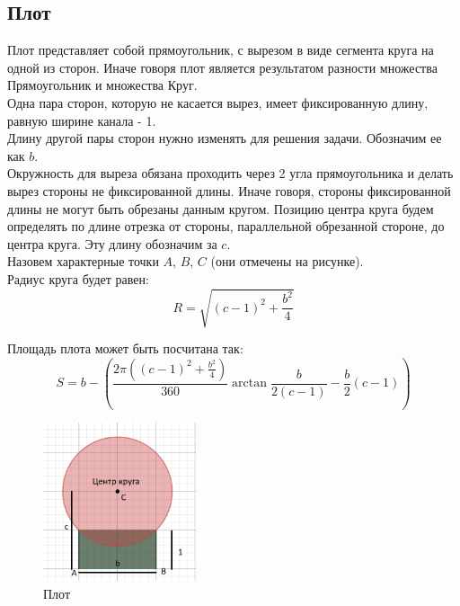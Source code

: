 \subsection{Плот}
Плот представляет собой прямоугольник, с вырезом в виде сегмента круга на одной из сторон. Иначе говоря плот является результатом разности множества Прямоугольник и множества Круг. \\

Одна пара сторон, которую не касается вырез, имеет фиксированную длину, равную ширине канала - 1. \\

Длину другой пары сторон нужно изменять для решения задачи. Обозначим ее как $b$. \\ 

Окружность для выреза обязана проходить через 2 угла прямоугольника и делать вырез стороны не фиксированной длины. Иначе говоря, стороны фиксированной длины не могут быть обрезаны данным кругом. Позицию центра круга будем определять по длине отрезка от стороны, параллельной обрезанной стороне, до центра круга. Эту длину обозначим за $c$. \\

Назовем характерные точки $A$, $B$, $C$ (они отмечены на рисунке).\\

Радиус круга будет равен:
\begin{equation}
R=\sqrt{(c-1)^2+\frac{b^2}{4}}
\end{equation}

Площадь плота может быть посчитана так:
\begin{equation}
S=b-(\frac{2\pi ((c-1)^2+\frac{b^2}{4})}{360} \arctan{\frac{b}{2(c-1)}} - \frac{b}{2}(c-1))
\end{equation}

\begin{figure}[!htb]
    \centering
    \includegraphics[width=0.4\textwidth]{fig/sofa.png}
    \caption{Плот}
\end{figure}


